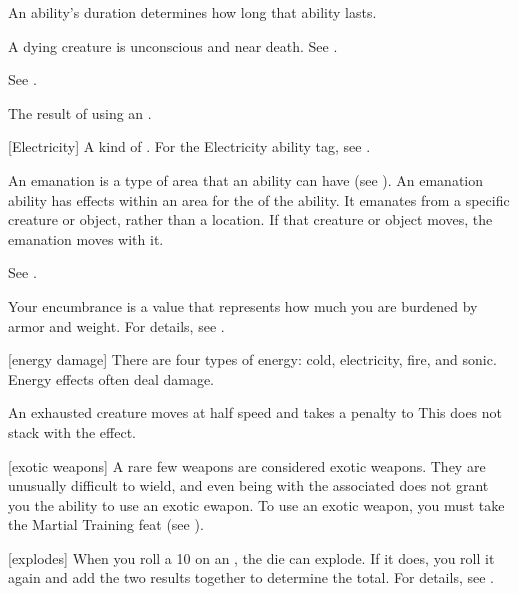  An ability's duration determines how long that ability lasts.

 A dying creature is unconscious and near death. See .

 See .

 The result of using an .

[Electricity] A kind of . For the Electricity ability tag, see .

 An emanation is a type of area that an ability can have (see ).
An emanation ability has effects within an area for the  of the ability.
It emanates from a specific creature or object, rather than a location.
If that creature or object moves, the emanation moves with it.

 See .

 Your encumbrance is a value that represents how much you are burdened by armor and weight.
For details, see .

[energy damage] There are four types of energy: cold, electricity, fire, and sonic. Energy effects often deal damage.


 An exhausted creature moves at half speed and takes a  penalty to 
This does not stack with the  effect.

[exotic weapons] A rare few weapons are considered exotic weapons.
They are unusually difficult to wield, and even being  with the associated  does not grant you the ability to use an exotic ewapon.
To use an exotic weapon, you must take the Martial Training feat (see ).

[explodes] When you roll a 10 on an , the die can explode.
If it does, you roll it again and add the two results together to determine the total.
For details, see .

